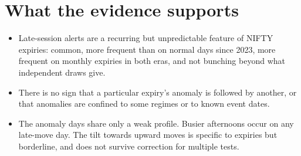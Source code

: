 \documentclass[10pt,a4paper]{article}
\begin{document}
\section*{What the evidence supports}
\begin{itemize}
\item Late-session alerts are a recurring but unpredictable feature of NIFTY expiries: common, more frequent than on normal days since 2023, more frequent on monthly expiries in both eras, and not bunching beyond what independent draws give.
\item There is no sign that a particular expiry's anomaly is followed by another, or that anomalies are confined to some regimes or to known event dates.
\item The anomaly days share only a weak profile. Busier afternoons occur on any late-move day. The tilt towards upward moves is specific to expiries but borderline, and does not survive correction for multiple tests.
\end{itemize}
\end{document}
